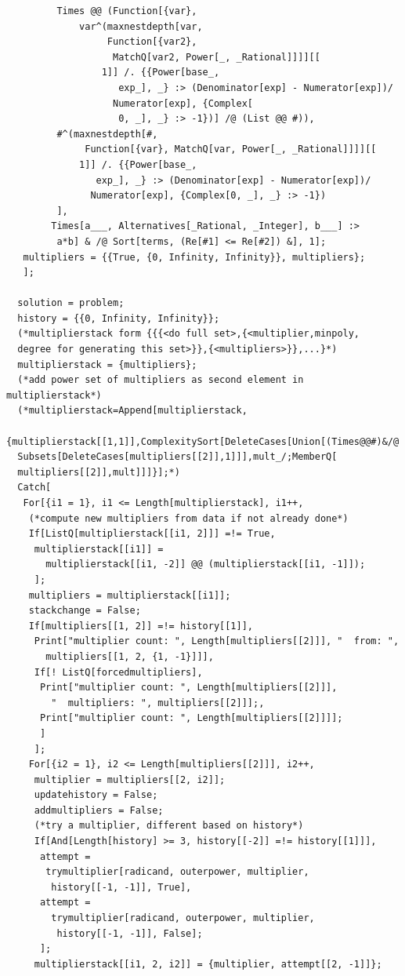 \documentclass[11pt,letterpaper]{article}
\theoremstyle{definition}
\theoremstyle{remark}
\begin{document}
\begin{lstlisting}
         Times @@ (Function[{var}, 
             var^(maxnestdepth[var, 
                  Function[{var2}, 
                   MatchQ[var2, Power[_, _Rational]]]][[
                 1]] /. {{Power[base_, 
                    exp_], _} :> (Denominator[exp] - Numerator[exp])/
                   Numerator[exp], {Complex[
                    0, _], _} :> -1})] /@ (List @@ #)),
         #^(maxnestdepth[#, 
              Function[{var}, MatchQ[var, Power[_, _Rational]]]][[
             1]] /. {{Power[base_, 
                exp_], _} :> (Denominator[exp] - Numerator[exp])/
               Numerator[exp], {Complex[0, _], _} :> -1})
         ], 
        Times[a___, Alternatives[_Rational, _Integer], b___] :> 
         a*b] & /@ Sort[terms, (Re[#1] <= Re[#2]) &], 1];
   multipliers = {{True, {0, Infinity, Infinity}}, multipliers};
   ];
  
  solution = problem;
  history = {{0, Infinity, Infinity}};
  (*multiplierstack form {{{<do full set>,{<multiplier,minpoly,
  degree for generating this set>}},{<multipliers>}},...}*)
  multiplierstack = {multipliers};
  (*add power set of multipliers as second element in multiplierstack*)
  (*multiplierstack=Append[multiplierstack,
  {multiplierstack[[1,1]],ComplexitySort[DeleteCases[Union[(Times@@#)&/@
  Subsets[DeleteCases[multipliers[[2]],1]]],mult_/;MemberQ[
  multipliers[[2]],mult]]]}];*)
  Catch[
   For[{i1 = 1}, i1 <= Length[multiplierstack], i1++,
    (*compute new multipliers from data if not already done*)
    If[ListQ[multiplierstack[[i1, 2]]] =!= True,
     multiplierstack[[i1]] = 
       multiplierstack[[i1, -2]] @@ (multiplierstack[[i1, -1]]);
     ];
    multipliers = multiplierstack[[i1]];
    stackchange = False;
    If[multipliers[[1, 2]] =!= history[[1]],
     Print["multiplier count: ", Length[multipliers[[2]]], "  from: ",
       multipliers[[1, 2, {1, -1}]]],
     If[! ListQ[forcedmultipliers],
      Print["multiplier count: ", Length[multipliers[[2]]], 
        "  multipliers: ", multipliers[[2]]];,
      Print["multiplier count: ", Length[multipliers[[2]]]];
      ]
     ];
    For[{i2 = 1}, i2 <= Length[multipliers[[2]]], i2++,
     multiplier = multipliers[[2, i2]];
     updatehistory = False;
     addmultipliers = False;
     (*try a multiplier, different based on history*)
     If[And[Length[history] >= 3, history[[-2]] =!= history[[1]]],
      attempt = 
       trymultiplier[radicand, outerpower, multiplier, 
        history[[-1, -1]], True],
      attempt = 
        trymultiplier[radicand, outerpower, multiplier, 
         history[[-1, -1]], False];
      ];
     multiplierstack[[i1, 2, i2]] = {multiplier, attempt[[2, -1]]};
     

\end{lstlisting}
\end{document}
